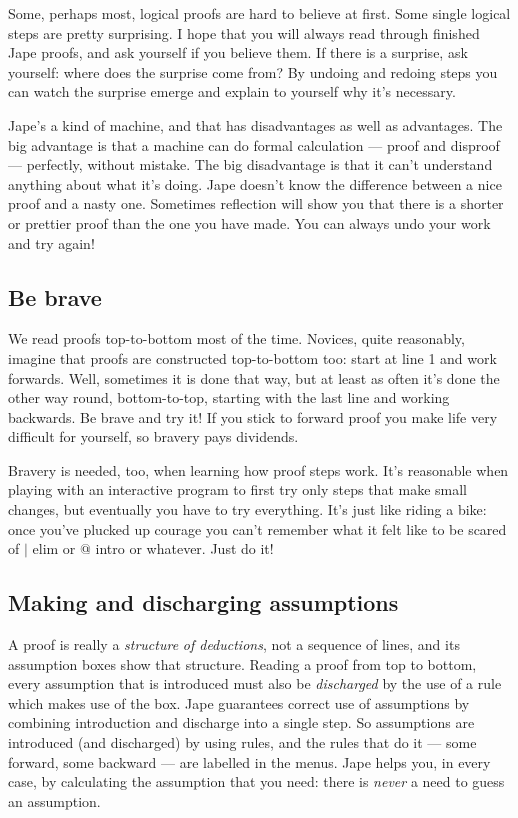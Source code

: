 \documentclass[11pt]{book}
\begin{document}
Some, perhaps most, logical proofs are hard to believe at first. Some single logical steps are pretty surprising. I hope that you will always read through finished Jape proofs, and ask yourself if you believe them. If there is a surprise, ask yourself: where does the surprise come from? By undoing and redoing steps you can watch the surprise emerge and explain to yourself why it's necessary.

Jape's a kind of machine, and that has disadvantages as well as advantages. The big advantage is that a machine can do formal calculation --- proof and disproof --- perfectly, without mistake. The big disadvantage is that it can't understand anything about what it's doing. Jape doesn't know the difference between a nice proof and a nasty one. Sometimes reflection will show you that there is a shorter or prettier proof than the one you have made. You can always undo your work and try again!

\subsection{Be brave}

We read proofs top-to-bottom most of the time. Novices, quite reasonably, imagine that proofs are constructed top-to-bottom too: start at line 1 and work forwards. Well, sometimes it is done that way, but at least as often it's done the other way round, bottom-to-top, starting with the last line and working backwards. Be brave and try it! If you stick to forward proof you make life very difficult for yourself, so bravery pays dividends.

Bravery is needed, too, when learning how proof steps work. It's reasonable when playing with an interactive program to first try only steps that make small changes, but eventually you have to try everything. It's just like riding a bike: once you've plucked up courage you can't remember what it felt like to be scared of $|$ elim or $@$ intro or whatever. Just do it!  

\subsection{Making and discharging assumptions}

A proof is really a \textit{structure} \textit{of deductions}, not a sequence of lines, and its assumption boxes show that structure. Reading a proof from top to bottom, every assumption that is introduced must also be \textit{discharged} by the use of a rule which makes use of the box. Jape guarantees correct use of assumptions by combining introduction and discharge into a single step. So assumptions are introduced (and discharged) by using rules, and the rules that do it --- some forward, some backward --- are labelled in the menus. Jape helps you, in every case, by calculating the assumption that you need: there is \textit{never} a need to guess an assumption.
\end{document}

